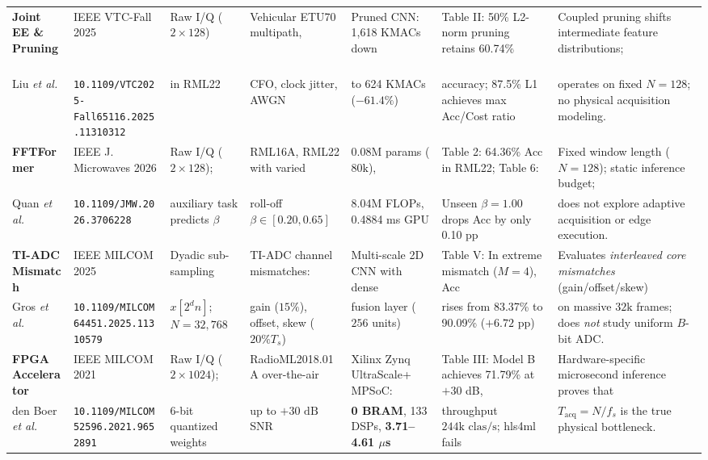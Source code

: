 \begin{table}[!t]
{\begin{tabular}{|l|l|l|l|l|l|l|}
\textbf{Joint EE \& Pruning}~\cite{liu2025joint} & 
IEEE VTC-Fall 2025 & 
Raw I/Q ($2 \times 128$) & 
Vehicular ETU70 multipath, & 
Pruned CNN: 1,618 KMACs down & 
Table II: 50\% L2-norm pruning retains 60.74\% & 
Coupled pruning shifts intermediate feature distributions; \\
Liu \emph{et al.} & 
\texttt{10.1109/VTC2025-Fall65116.2025.11310312} & 
in RML22 & 
CFO, clock jitter, AWGN & 
to 624 KMACs ($-61.4\%$) & 
accuracy; 87.5\% L1 achieves max Acc/Cost ratio & 
operates on fixed $N=128$; no physical acquisition modeling. \\ \hline

\textbf{FFTFormer}~\cite{quan2026fftformer} & 
IEEE J. Microwaves 2026 & 
Raw I/Q ($2 \times 128$); & 
RML16A, RML22 with varied & 
0.08M params ($80\text{k}$), & 
Table 2: 64.36\% Acc in RML22; Table 6: & 
Fixed window length ($N=128$); static inference budget; \\
Quan \emph{et al.} & 
\texttt{10.1109/JMW.2026.3706228} & 
auxiliary task predicts $\beta$ & 
roll-off $\beta \in [0.20, 0.65]$ & 
8.04M FLOPs, 0.4884 ms GPU & 
Unseen $\beta=1.00$ drops Acc by only 0.10 pp & 
does not explore adaptive acquisition or edge execution. \\ \hline

\textbf{TI-ADC Mismatch}~\cite{gros2025mitigating} & 
IEEE MILCOM 2025 & 
Dyadic sub-sampling & 
TI-ADC channel mismatches: & 
Multi-scale 2D CNN with dense & 
Table V: In extreme mismatch ($M=4$), Acc & 
Evaluates \emph{interleaved core mismatches} (gain/offset/skew) \\
Gros \emph{et al.} & 
\texttt{10.1109/MILCOM64451.2025.11310579} & 
$x[2^d n]$; $N=32,768$ & 
gain ($15\%$), offset, skew ($20\% T_s$) & 
fusion layer ($256$ units) & 
rises from 83.37\% to 90.09\% ($+6.72\text{ pp}$) & 
on massive $32\text{k}$ frames; does \emph{not} study uniform $B$-bit ADC. \\ \hline

\textbf{FPGA Accelerator}~\cite{denboer2021fpga} & 
IEEE MILCOM 2021 & 
Raw I/Q ($2 \times 1024$); & 
RadioML2018.01A over-the-air & 
Xilinx Zynq UltraScale+ MPSoC: & 
Table III: Model B achieves 71.79\% at $+30$ dB, & 
Hardware-specific microsecond inference proves that \\
den Boer \emph{et al.} & 
\texttt{10.1109/MILCOM52596.2021.9652891} & 
6-bit quantized weights & 
up to $+30\text{ dB}$ SNR & 
\textbf{0 BRAM}, 133 DSPs, \textbf{3.71--4.61 $\mu$s} & 
throughput $244\text{k clas/s}$; hls4ml fails & 
$T_{\text{acq}} = N/f_s$ is the true physical bottleneck. \\ \hline


\end{tabular}}
\end{table}
